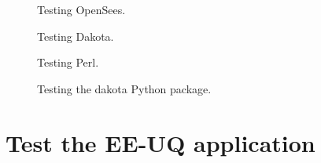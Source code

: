 \begin{figure}[!htbp]
  \caption{Testing OpenSees.}
  \label{fig:opensees_test}
\end{figure}

\begin{figure}[!htbp]
  \caption{Testing Dakota.}
  \label{fig:dakota_test}
\end{figure}

\begin{figure}[!htbp]
  \caption{Testing Perl.}
  \label{fig:perl_test}
\end{figure}

\begin{figure}[!htbp]
  \caption{Testing the dakota Python package.}
  \label{fig:dakota_py_test}
\end{figure}

\section{Test the EE-UQ application}
\label{sec:test_local}

